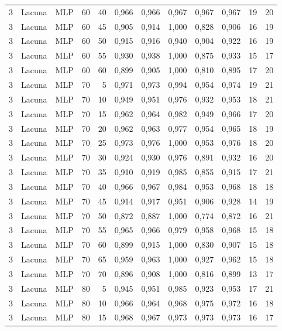 \begin{longtable}{@{}rllrrrrrrrrr@{}}
3 & Lacuna & MLP & 60 & 40 & 0,966 & 0,966 & 0,967 & 0,967 & 0,967 & 19 & 20 \\
3 & Lacuna & MLP & 60 & 45 & 0,905 & 0,914 & 1,000 & 0,828 & 0,906 & 16 & 19 \\
3 & Lacuna & MLP & 60 & 50 & 0,915 & 0,916 & 0,940 & 0,904 & 0,922 & 16 & 19 \\
3 & Lacuna & MLP & 60 & 55 & 0,930 & 0,938 & 1,000 & 0,875 & 0,933 & 15 & 17 \\
3 & Lacuna & MLP & 60 & 60 & 0,899 & 0,905 & 1,000 & 0,810 & 0,895 & 17 & 20 \\
3 & Lacuna & MLP & 70 & 5 & 0,971 & 0,973 & 0,994 & 0,954 & 0,974 & 19 & 21 \\
3 & Lacuna & MLP & 70 & 10 & 0,949 & 0,951 & 0,976 & 0,932 & 0,953 & 18 & 21 \\
3 & Lacuna & MLP & 70 & 15 & 0,962 & 0,964 & 0,982 & 0,949 & 0,966 & 17 & 20 \\
3 & Lacuna & MLP & 70 & 20 & 0,962 & 0,963 & 0,977 & 0,954 & 0,965 & 18 & 19 \\
3 & Lacuna & MLP & 70 & 25 & 0,973 & 0,976 & 1,000 & 0,953 & 0,976 & 18 & 20 \\
3 & Lacuna & MLP & 70 & 30 & 0,924 & 0,930 & 0,976 & 0,891 & 0,932 & 16 & 20 \\
3 & Lacuna & MLP & 70 & 35 & 0,910 & 0,919 & 0,985 & 0,855 & 0,915 & 17 & 21 \\
3 & Lacuna & MLP & 70 & 40 & 0,966 & 0,967 & 0,984 & 0,953 & 0,968 & 18 & 18 \\
3 & Lacuna & MLP & 70 & 45 & 0,914 & 0,917 & 0,951 & 0,906 & 0,928 & 14 & 19 \\
3 & Lacuna & MLP & 70 & 50 & 0,872 & 0,887 & 1,000 & 0,774 & 0,872 & 16 & 21 \\
3 & Lacuna & MLP & 70 & 55 & 0,965 & 0,966 & 0,979 & 0,958 & 0,968 & 15 & 18 \\
3 & Lacuna & MLP & 70 & 60 & 0,899 & 0,915 & 1,000 & 0,830 & 0,907 & 15 & 18 \\
3 & Lacuna & MLP & 70 & 65 & 0,959 & 0,963 & 1,000 & 0,927 & 0,962 & 15 & 18 \\
3 & Lacuna & MLP & 70 & 70 & 0,896 & 0,908 & 1,000 & 0,816 & 0,899 & 13 & 17 \\
3 & Lacuna & MLP & 80 & 5 & 0,945 & 0,951 & 0,985 & 0,923 & 0,953 & 17 & 21 \\
3 & Lacuna & MLP & 80 & 10 & 0,966 & 0,964 & 0,968 & 0,975 & 0,972 & 16 & 18 \\
3 & Lacuna & MLP & 80 & 15 & 0,968 & 0,967 & 0,973 & 0,973 & 0,973 & 16 & 17 \\

\end{longtable}
